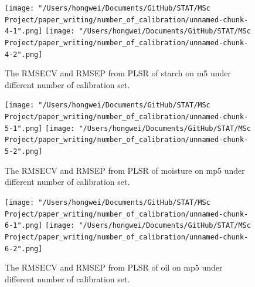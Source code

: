 \documentclass[a4paper,12pt,titlepage]{article} %
\numberwithin{equation}{section}  %
\begin{document}
\begin{appendices}
			\begin{figure}[h]    %
	\centering           %
	\texttt{[image: "/Users/hongwei/Documents/GitHub/STAT/MSc Project/paper\_writing/number\_of\_calibration/unnamed-chunk-4-1".png]}  %
	\texttt{[image: "/Users/hongwei/Documents/GitHub/STAT/MSc Project/paper\_writing/number\_of\_calibration/unnamed-chunk-4-2".png]}  %
	\caption{The RMSECV and RMSEP from PLSR of starch on m5 under different number of calibration set.}          %
	\label{fig:calibration_4-1}               %
\end{figure}                        %



			\begin{figure}[h]    %
	\centering           %
	\texttt{[image: "/Users/hongwei/Documents/GitHub/STAT/MSc Project/paper\_writing/number\_of\_calibration/unnamed-chunk-5-1".png]}  %
	\texttt{[image: "/Users/hongwei/Documents/GitHub/STAT/MSc Project/paper\_writing/number\_of\_calibration/unnamed-chunk-5-2".png]}  %
	\caption{The RMSECV and RMSEP from PLSR of moisture on mp5 under different number of calibration set.}          %
	\label{fig:calibration_5-1}               %
\end{figure}                        %



			\begin{figure}[h]    %
	\centering           %
	\texttt{[image: "/Users/hongwei/Documents/GitHub/STAT/MSc Project/paper\_writing/number\_of\_calibration/unnamed-chunk-6-1".png]}  %
	\texttt{[image: "/Users/hongwei/Documents/GitHub/STAT/MSc Project/paper\_writing/number\_of\_calibration/unnamed-chunk-6-2".png]}  %
	\caption{The RMSECV and RMSEP from PLSR of oil on mp5 under different number of calibration set.}          %
	\label{fig:calibration_6-1}               %
\end{figure}                        %




\end{appendices}
\end{document}
